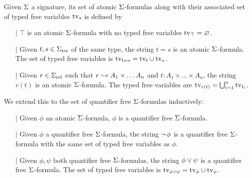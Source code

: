 \begin{dfn}
    Given $\Sigma$ a signature, 
    its set of atomic $\Sigma$-formulas along with their 
    associated set of typed free variables $\textrm{tv}_{\star}$ is defined by
    \begin{itemize}
        \item[$\vert$] $\top$ is an atomic $\Sigma$-formula
        with no typed free variables $\textrm{tv}_{\top} = \varnothing$.
        \item[$\vert$] 
        Given $t, s \in {\Sigma}_\mathrm{ter}$ of the same type, 
        the string $t = s$ is an atomic $\Sigma$-formula.
        The set of typed free variables is 
        $\textrm{tv}_{t = s} = \textrm{tv}_{t} \cup \textrm{tv}_{s}$.
        \item[$\vert$] Given $r \in {\Sigma}_\mathrm{rel}$ such that
        $r \hookrightarrow A_1 \times \dots A_n$ and $t : A_1 \times \dots \times A_n$,
        the string $r(t)$ is an atomic $\Sigma$-formula. 
        The typed free variables are $\textrm{tv}_{r(t)} = \bigcup_{i = 1}^n \textrm{tv}_{t_i}$.
    \end{itemize}
    
    We extend this to the set of quantifier free $\Sigma$-formulas inductively:
    \begin{itemize}
        \item[$\vert$] Given $\phi$ an atomic $\Sigma$-formula,
            $\phi$ is a quantifier free $\Sigma$-formula.
        \item[$\vert$] Given $\phi$ a quantifier free $\Sigma$-formula, 
        the string $\neg\, \phi$ is a quantifier free $\Sigma$-formula with the 
        same set of typed free variables as $\phi$. 
        \item[$\vert$] Given $\phi, \psi$ both quantifier free $\Sigma$-formulas, 
        the string $\phi \lor \psi$ is a quantifier free $\Sigma$-formula.
        The set of typed free variables is 
        $\textrm{tv}_{\phi \lor \psi} = \textrm{tv}_{\phi} \cup \textrm{tv}_{\psi}$.
    \end{itemize}
    

\end{dfn}
